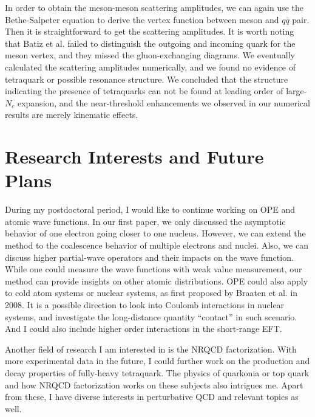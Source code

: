 \documentclass[letterpaper,11pt]{article}
\begin{document}
In order to obtain the meson-meson scattering amplitudes, we can again use the Bethe-Salpeter equation to derive the vertex function between meson and $q\bar q$ pair. Then it is straightforward to get the scattering amplitudes. It is worth noting that Batiz et al. failed to distinguish the outgoing and incoming quark for the meson vertex, and they missed the gluon-exchanging diagrams. We eventually calculated the scattering amplitudes numerically, and we found no evidence of tetraquark or possible resonance structure. We concluded that the structure indicating the presence of tetraquarks can not be found at leading order of large-$N_c$ expansion, and the near-threshold enhancements we observed in our numerical results are merely kinematic effects.

\section*{Research Interests and Future Plans}
During my postdoctoral period, I would like to continue working on OPE and atomic wave functions. In our first paper, we only discussed the asymptotic behavior of one electron going closer to one nucleus. However, we can extend the method to the coalescence behavior of multiple electrons and nuclei. Also, we can discuss higher partial-wave operators and their impacts on the wave function. While one could measure the wave functions with weak value measurement, our method can provide insights on other atomic distributions.
OPE could also apply to cold atom systems or nuclear systems, as first proposed by Braaten et al. in 2008. It is a possible direction to look into Coulomb interactions in nuclear systems, and investigate the long-distance quantity ``contact'' in such scenario. And I could also include higher order interactions in the short-range EFT.

Another field of research I am interested in is the NRQCD factorization. With more experimental data in the future, I could further work on the production and decay properties of fully-heavy tetraquark. The physics of quarkonia or top quark and how NRQCD factorization works on these subjects also intrigues me. Apart from these, I have diverse interests in perturbative QCD and relevant topics as well.




\end{document}
